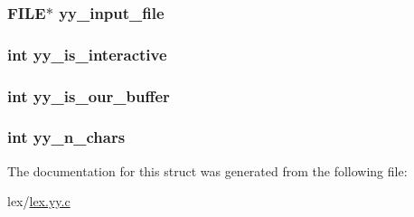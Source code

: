 \subsubsection[{\texorpdfstring{yy\+\_\+input\+\_\+file}{yy_input_file}}]{\setlength{\rightskip}{0pt plus 5cm}F\+I\+LE$\ast$ yy\+\_\+input\+\_\+file}\hypertarget{structyy__buffer__state_afb2a40bf9a1b84be81d8e8c0bbcbee21}{}\label{structyy__buffer__state_afb2a40bf9a1b84be81d8e8c0bbcbee21}
\subsubsection[{\texorpdfstring{yy\+\_\+is\+\_\+interactive}{yy_is_interactive}}]{\setlength{\rightskip}{0pt plus 5cm}int yy\+\_\+is\+\_\+interactive}\hypertarget{structyy__buffer__state_a2a823a361fbbe1af51a957d0d0cbf4e2}{}\label{structyy__buffer__state_a2a823a361fbbe1af51a957d0d0cbf4e2}
\subsubsection[{\texorpdfstring{yy\+\_\+is\+\_\+our\+\_\+buffer}{yy_is_our_buffer}}]{\setlength{\rightskip}{0pt plus 5cm}int yy\+\_\+is\+\_\+our\+\_\+buffer}\hypertarget{structyy__buffer__state_a1e64bbdc1343d886bee3af97e19644bc}{}\label{structyy__buffer__state_a1e64bbdc1343d886bee3af97e19644bc}
\subsubsection[{\texorpdfstring{yy\+\_\+n\+\_\+chars}{yy_n_chars}}]{\setlength{\rightskip}{0pt plus 5cm}int yy\+\_\+n\+\_\+chars}\hypertarget{structyy__buffer__state_aa86c122f2050dbfd365fcf547e6fc1c3}{}\label{structyy__buffer__state_aa86c122f2050dbfd365fcf547e6fc1c3}


The documentation for this struct was generated from the following file\+:\begin{DoxyCompactItemize}
\item 
lex/\hyperlink{lex_8yy_8c}{lex.\+yy.\+c}\end{DoxyCompactItemize}

